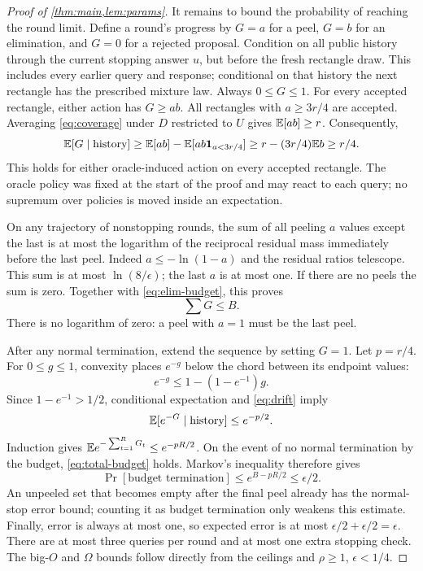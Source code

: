 \begin{proof}[Proof of \cref{thm:main,lem:params}]
It remains to bound the probability of reaching the round limit. Define a round's progress by $G=a$ for a peel, $G=b$ for an elimination, and $G=0$ for a rejected proposal. Condition on all public history through the current stopping answer $\widehat u$, but before the fresh rectangle draw. This includes every earlier query and response; conditional on that history the next rectangle has the prescribed mixture law. Always $0\le G\le1$. For every accepted rectangle, either action has $G\ge ab$. All rectangles with $a\ge3r/4$ are accepted. Averaging \eqref{eq:coverage} under $D$ restricted to $U$ gives $\mathbb E[ab]\ge r$. Consequently,
\begin{equation}\label{eq:drift}
 \mathbb E[G\mid\text{history}]
 \ge \mathbb E[ab]-\mathbb E[ab\mathbf 1_{a<3r/4}]
 \ge r-(3r/4)\mathbb E b\ge r/4.
\end{equation}
This holds for either oracle-induced action on every accepted rectangle. The oracle policy was fixed at the start of the proof and may react to each query; no supremum over policies is moved inside an expectation.

On any trajectory of nonstopping rounds, the sum of all peeling $a$ values except the last is at most the logarithm of the reciprocal residual mass immediately before the last peel. Indeed $a\le-\ln(1-a)$ and the residual ratios telescope. This sum is at most $\ln(8/\epsilon)$; the last $a$ is at most one. If there are no peels the sum is zero. Together with \eqref{eq:elim-budget}, this proves
\begin{equation}\label{eq:total-budget}
 \sum G\le B.
\end{equation}
There is no logarithm of zero: a peel with $a=1$ must be the last peel.

After any normal termination, extend the sequence by setting $G=1$. Let $p=r/4$. For $0\le g\le1$, convexity places $e^{-g}$ below the chord between its endpoint values:
\[
 e^{-g}\le1-(1-e^{-1})g.
\]
Since $1-e^{-1}>1/2$, conditional expectation and \eqref{eq:drift} imply
\[
 \mathbb E[e^{-G}\mid\text{history}]\le e^{-p/2}.
\]
Induction gives $\mathbb E e^{-\sum_{t=1}^RG_t}\le e^{-pR/2}$. On the event of no normal termination by the budget, \eqref{eq:total-budget} holds. Markov's inequality therefore gives
\[
 \Pr[\text{budget termination}]
 \le e^{B-pR/2}\le\epsilon/2.
\]
An unpeeled set that becomes empty after the final peel already has the normal-stop error bound; counting it as budget termination only weakens this estimate. Finally, error is always at most one, so expected error is at most $\epsilon/2+\epsilon/2=\epsilon$. There are at most three queries per round and at most one extra stopping check. The big-$O$ and $\Omega$ bounds follow directly from the ceilings and $\rho\ge1$, $\epsilon<1/4$.
\end{proof}

